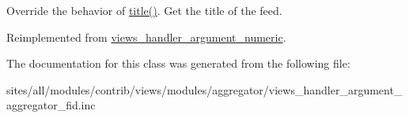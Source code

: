 Override the behavior of \hyperlink{classviews__handler__argument__numeric_480758dbcde899b5483b091e51e2bf39}{title()}. Get the title of the feed. 

Reimplemented from \hyperlink{classviews__handler__argument__numeric_5c6f566b06bad6057e92f15d82311c7b}{views\_\-handler\_\-argument\_\-numeric}.

The documentation for this class was generated from the following file:\begin{CompactItemize}
\item 
sites/all/modules/contrib/views/modules/aggregator/views\_\-handler\_\-argument\_\-aggregator\_\-fid.inc\end{CompactItemize}
